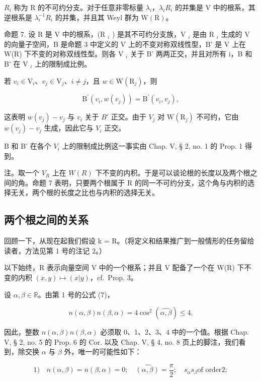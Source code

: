 \(R_{i}\) 称为 R 的不可约分支。对于任意非零标量 \(\lambda_{i}\)，\(\lambda_{i}R_{i}\) 的并集是 V 中的根系，其逆根系是 \(\lambda_{i}^{-1}R_{i}\) 的并集，并且其 Weyl 群为 \(\mathrm{W}(\mathrm{R})\)。

命题 7. 设 R 是 V 中的根系，(R \(_{i}\) ) 是其不可约分支族，V \(_{i}\) 是由 R \(_{i}\) 生成的 V 的向量子空间，B 是命题 3 中定义的 V 上的不变对称双线性型，B' 是 V 上在 W(R) 下不变的对称双线性型。则各 V \(_{i}\) 关于 B' 两两正交，并且对所有 i，B 和 B' 在 V \(_{i}\) 上的限制成比例。

若 \(v_{i} \in \mathrm{V}_{i}\)、\(v_{j} \in \mathrm{V}_{j}\)、\(i \neq j\)，且 \(w \in \mathrm{W}(\mathrm{R}_j)\)，则

\[
\mathrm{B} ^ {\prime} (v _ {i}, w (v _ {j})) = \mathrm{B} ^ {\prime} (v _ {i}, v _ {j}),
\]

这表明 \(w(v_{j}) - v_{j}\) 与 \(v_{i}\) 关于 \(B'\) 正交。由于 \(V_{j}\) 对 \(\mathrm{W}(\mathrm{R}_{j})\) 不可约，它由 \(w(v_{j}) - v_{j}\) 生成，因此它与 \(V_{i}\) 正交。

B 和 B' 在各个 \(V_{i}\) 上的限制成比例这一事实由 Chap. V, § 2, no. 1 的 Prop. 1 得到。

注。取一个 \(V_{R}\) 上在 \(W(R)\) 下不变的内积。于是可以谈论根的长度以及两个根之间的角。命题 7 表明，只要两个根属于 R 的同一不可约分支，这个角与内积的选择无关，两个根的长度之比也与内积的选择无关。

\subsection{两个根之间的关系}

回顾一下，从现在起我们假设 k = R。（将定义和结果推广到一般情形的任务留给读者，方法见第 1 号的注记 2。）

以下始终，R 表示向量空间 V 中的一个根系；并且 V 配备了一个在 W(R) 下不变的内积 \((x,y)\mapsto(x|y)\)，cf.~Prop. 3。

设 \(\alpha, \beta \in \mathbb{R}\)。由第 1 号的公式 (7)，

\[
n (\alpha , \beta) n (\beta , \alpha) = 4 \cos^ {2} (\widehat {\alpha , \beta}) \leqslant 4.\tag{10}
\]

因此，整数 \(n(\alpha,\beta)n(\beta,\alpha)\) 必须取 0、1、2、3、4 中的一个值。根据 Chap. V, § 2, no. 5 的 Prop. 6 的 Cor. 以及 Chap. V, § 4, no. 8 页上的脚注，我们看到，除交换 \(\alpha\) 与 \(\beta\) 外，唯一的可能性如下：

\[
1) \quad n (\alpha , \beta) = n (\beta , \alpha) = 0; \quad \widehat {(\alpha , \beta)} = \frac {\pi}{2}; \quad s _ {\alpha} s _ {\beta} \text {of order} 2;
\]

